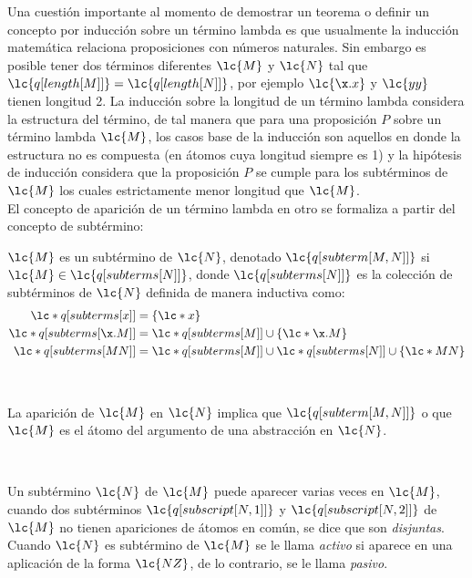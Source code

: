 Una cuestión importante al momento de demostrar un teorema o definir un concepto
por inducción sobre un término lambda es que usualmente la inducción matemática
relaciona proposiciones con números naturales. Sin embargo es posible tener dos
términos diferentes \(\lc{M}\) y \(\lc{N}\) tal que
\(\lc{q[length[M]]}=\lc{q[length[N]]}\), por ejemplo \(\lc{\x.x}\) y \(\lc{y
  y}\) tienen longitud 2. La inducción sobre la longitud de un término lambda
considera la estructura del término, de tal manera que para una proposición
\(P\) sobre un término lambda \(\lc{M}\), los casos base de la inducción son
aquellos en donde la estructura no es compuesta (en átomos cuya longitud siempre
es 1) y la hipótesis de inducción considera que la proposición \(P\) se cumple
para los subtérminos de \(\lc{M}\) los cuales estrictamente menor longitud que
\(\lc{M}\). \\

El concepto de aparición de un término lambda en otro se formaliza a partir del
concepto de subtérmino: \\

\begin{defi}[Subtérmino] \(\lc{M}\) es un subtérmino de \(\lc{N}\), denotado
  \(\lc{q[subterm[M,N]]}\) si \(\lc{M} \in \lc{q[subterms[N]]}\), donde
  \(\lc{q[subterms[N]]}\) es la colección de subtérminos de \(\lc{N}\) definida
  de manera inductiva como:
  \label{definicion:subtermino}
  \begin{align*}
    \lc*{q[subterms[x]]} &= \{\lc*{x}\} \\
    \lc*{q[subterms[\x.M]]} &= \lc*{q[subterms[M]]} \cup \{\lc*{\x.M}\} \\
    \lc*{q[subterms[M N]]} &= \lc*{q[subterms[M]]} \cup \lc*{q[subterms[N]]} \cup \{\lc*{M N}\}
  \end{align*}
\end{defi} \

\begin{defi}[Aparición] La aparición de \(\lc{M}\) en \(\lc{N}\) implica que
  \(\lc{q[subterm[M,N]]}\) o que \(\lc{M}\) es el átomo del argumento de una
  abstracción en \(\lc{N}\).
  \label{definicion:aparicion}
\end{defi} \

Un subtérmino \(\lc{N}\) de \(\lc{M}\) puede aparecer varias veces en
\(\lc{M}\), cuando dos subtérminos \(\lc{q[subscript[N,1]]}\) y
\(\lc{q[subscript[N,2]]}\) de \(\lc{M}\) no tienen apariciones de átomos en
común, se dice que son \emph{disjuntas}. Cuando \(\lc{N}\) es subtérmino de
\(\lc{M}\) se le llama \emph{activo} si aparece en una aplicación de la forma
\(\lc{N Z}\), de lo contrario, se le llama \emph{pasivo}. \\

